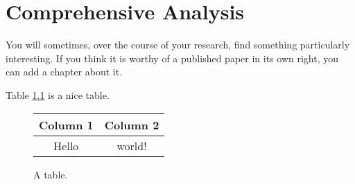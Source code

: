 \chapter{Comprehensive Analysis}
You will sometimes, over the course of your research, find something
particularly interesting. If you think it is worthy of a published paper in
its own right, you can add a chapter about it.

\lipsum[25]

Table \ref{table:mytable} is a nice table.

\lipsum[30]

\begin{figure}
  \centering
  \begin{tabular}{cc}
    \toprule
    Column 1 & Column 2 \\
    \midrule
    Hello & world! \\
    \bottomrule
  \end{tabular}
  \caption{A table.}
  \label{table:mytable}
\end{figure}


\lipsum[20-25]